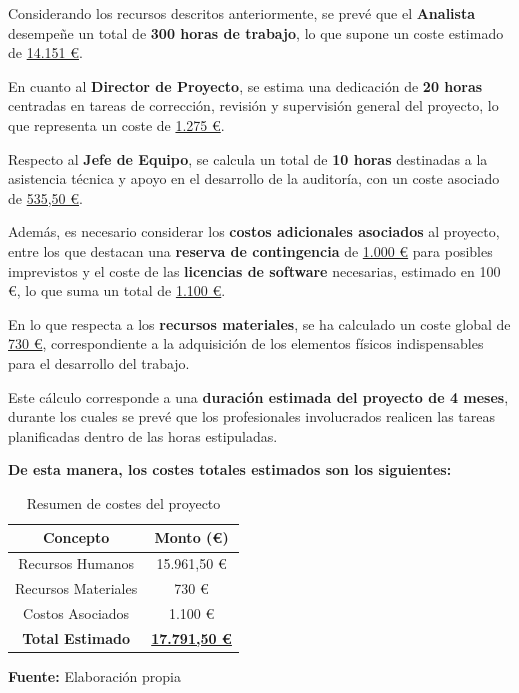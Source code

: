 \documentclass[a4paper, 10pt]{article}
\begin{document}
Considerando los recursos descritos anteriormente, se prevé que el \textbf{Analista} desempeñe un total de \textbf{300 horas de trabajo}, lo que supone un coste estimado de \underline{14.151 €}.  
\par\vspace{0.3cm}

En cuanto al \textbf{Director de Proyecto}, se estima una dedicación de \textbf{20 horas} centradas en tareas de corrección, revisión y supervisión general del proyecto, lo que representa un coste de \underline{1.275 €}.  
\par\vspace{0.3cm}

Respecto al \textbf{Jefe de Equipo}, se calcula un total de \textbf{10 horas} destinadas a la asistencia técnica y apoyo en el desarrollo de la auditoría, con un coste asociado de \underline{535,50 €}.  
\par\vspace{0.3cm}

Además, es necesario considerar los \textbf{costos adicionales asociados} al proyecto, entre los que destacan una \textbf{reserva de contingencia} de \underline{1.000 €} para posibles imprevistos y el coste de las \textbf{licencias de software} necesarias, estimado en 100 €, lo que suma un total de \underline{1.100 €}.  
\par\vspace{0.3cm}

En lo que respecta a los \textbf{recursos materiales}, se ha calculado un coste global de \underline{730 €}, correspondiente a la adquisición de los elementos físicos indispensables para el desarrollo del trabajo.  
\par\vspace{0.3cm}

Este cálculo corresponde a una \textbf{duración estimada del proyecto de 4 meses}, durante los cuales se prevé que los profesionales involucrados realicen las tareas planificadas dentro de las horas estipuladas.  

\par\vspace{0.5cm}
\textbf{De esta manera, los costes totales estimados son los siguientes:}  

\begin{table}[H]
\caption{Resumen de costes del proyecto}
\centering
\renewcommand{\arraystretch}{1.5}
\begin{tabular}{|c|c|}
\hline
\textbf{Concepto} & \textbf{Monto (€)} \\ \hline
Recursos Humanos & 15.961,50 € \\ \hline
Recursos Materiales & 730 € \\ \hline
Costos Asociados & 1.100 € \\ \hline
\textbf{Total Estimado} & \underline{\textbf{17.791,50 €}} \\ \hline
\end{tabular}
\begin{flushleft}\centering
    \footnotesize \textbf{Fuente:} Elaboración propia
\end{flushleft}   
\label{tab:resumen_costes}
\end{table}
\end{document}
